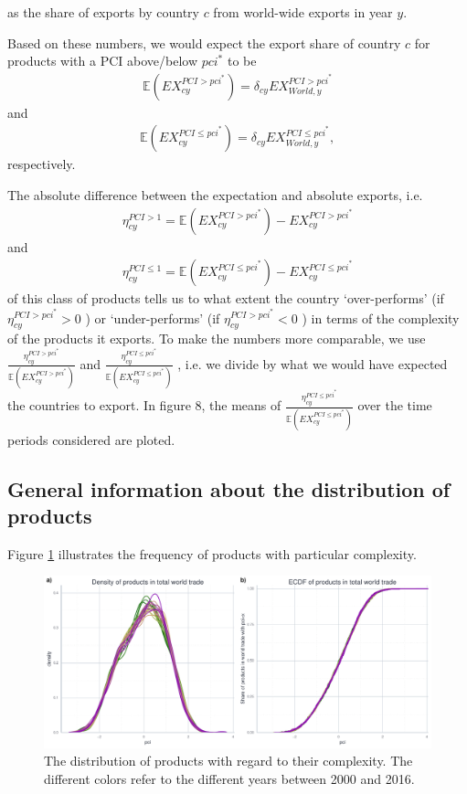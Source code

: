 \documentclass[11pt,a4paper]{article}
\begin{document}
as the share of exports by country $c$ from world-wide exports in year $y$.

Based on these numbers, we would expect the export share of country $c$ for products with a PCI above/below $pci^*$ to be
\begin{align}
\mathbb{E}\left(EX_{cy}^{PCI>pci^*}\right)=\delta_{cy}EX_{World, y}^{PCI>pci^*}
\end{align}
and
\begin{align}
\mathbb{E}\left(EX_{cy}^{PCI\leq pci^*}\right)=\delta_{cy}EX_{World, y}^{PCI\leq pci^*},
\end{align}
respectively. 
   
The absolute difference between the expectation and absolute exports, i.e. 
\begin{align}
\eta_{cy}^{PCI>1} = \mathbb{E}\left(EX_{cy}^{PCI>pci^*}\right) - EX_{cy}^{PCI>pci^*}
\end{align}
and 
\begin{align}
\eta_{cy}^{PCI\leq 1} = \mathbb{E}\left(EX_{cy}^{PCI\leq pci^*}\right) - EX_{cy}^{PCI\leq pci^*}
\end{align}
of this class of products tells us to what extent the country `over-performs' (if 
$\eta_{cy}^{PCI>pci^*}>0$
) or `under-performs' (if 
$\eta_{cy}^{PCI>pci^*}<0$
) in terms of the complexity of the products it exports. 
To make the numbers more comparable, we use 
$\frac{\eta_{cy}^{PCI>pci^*} }{\mathbb{E}\left(EX_{cy}^{PCI>pci^*}\right)}$ and 
$\frac{\eta_{cy}^{PCI\leq pci^*} }{\mathbb{E}\left(EX_{cy}^{PCI\leq pci^*}\right)}$
, i.e. we divide by what we would have expected the countries to export. 
In figure 8, the means of $\frac{\eta_{cy}^{PCI\leq pci^*} }{\mathbb{E}\left(EX_{cy}^{PCI\leq pci^*}\right)}$
over the time periods considered are ploted.

\subsection{General information about the distribution of products}
Figure \ref{fig:product-dist} illustrates the frequency of products with particular complexity.

\begin{figure}[h]
\includegraphics[width=\textwidth]{../output/fig_A1_dist-pci.pdf}
\caption{The distribution of products with regard to their complexity.
The different colors refer to the different years between 2000 and 2016.}
\label{fig:product-dist}
\end{figure}
\end{document}

